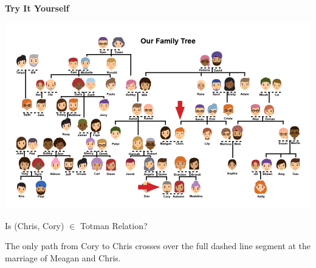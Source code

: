 \documentclass{ximera}
\begin{document}
\begin{example}
\quad \\
\textbf{Try It Yourself}

\begin{image}
\includegraphics{pics/Chris_Cory_arrow.png}
\end{image}

Is (Chris, Cory) $\in$ Totman Relation?
\begin{multipleChoice}
\end{multipleChoice}
\begin{feedback}
The only path from Cory to Chris crosses over the full dashed line segment at the marriage of Meagan and Chris.
\end{feedback}


\end{example}
\quad \\
\end{document}
